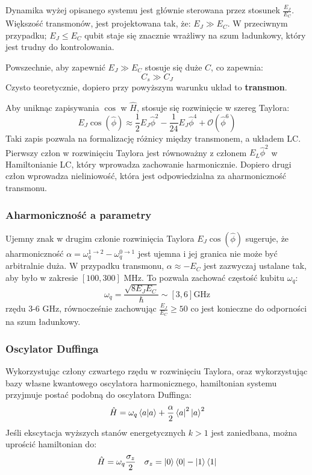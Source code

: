 \documentclass{../notatki}
\begin{document}
Dynamika wyżej opisanego systemu jest głównie sterowana przez
stosunek $\frac{E_J}{E_C}$. Większość transmonów, jest projektowana
tak, że: $E_J \gg E_C$. W przeciwnym przypadku; $E_J \leq E_C$ qubit
staje się znacznie wrażliwy na szum ładunkowy, który jest trudny do
kontrolowania.

Powszechnie, aby zapewnić $E_J \gg E_C$ stosuje się duże $C$, co zapewnia:
$$
C_s \gg C_J
$$
Czysto teoretycznie, dopiero przy powyższym warunku układ to \textbf{transmon}.

Aby uniknąc zapisywania $\cos$ w $\hat{H}$, stosuje się rozwinięcie w
szereg Taylora:
$$
E_J \cos(\hat{\phi}) \approx \frac{1}{2} E_J
\hat{\phi}^2 - \frac{1}{24} E_J \hat{\phi}^4 + \mathcal{O}(\hat{\phi}^6)
$$
Taki zapis pozwala na formalizację różnicy między transmonem, a
układem LC. Pierwszy człon w rozwinięciu Taylora jest równoważny z
członem $E_L \hat{\phi}^2$ w Hamiltonianie LC, który wprowadza zachowanie
harmonicznie. Dopiero drugi człon wprowadza nieliniowość, która jest
odpowiedzialna za
aharmoniczność transmonu.

\subsubsection{Aharmoniczność a parametry}

Ujemny znak w drugim członie rozwinięcia Taylora $E_J
\cos(\hat{\phi})$ sugeruje, że
aharmoniczność $\alpha = \omega_q^{1 \to 2} - \omega_q^{0 \to 1}$
jest ujemna i jej granica nie może być arbitralnie duża. W przypadku
transmonu, $\alpha \approx -E_C$ jest zazwyczaj ustalane tak, aby było w
zakresie $[100, 300]$ MHz. To pozwala zachować częstość kubitu $\omega_q$:
$$
\omega_q = \frac{\sqrt{8E_JE_C}}{\hbar} \sim [3, 6] \text{GHz}
$$
rzędu 3-6 GHz, równocześnie zachowując $\frac{E_J}{E_C} \geq 50$ co
jest konieczne do odporności na szum ładunkowy.

\subsubsection{Oscylator Duffinga}

Wykorzystując człony czwartego rzędu w rozwinięciu Taylora, oraz wykorzystując
bazy własne kwantowego oscylatora harmonicznego, hamiltonian systemu przyjmuje
postać podobną do oscylatora Duffinga:
$$
\hat{H} = \omega_q \bra{a}\ket{a} + \frac{\alpha}{2} \bra{a}^2\ket{a}^2
$$
Jeśli ekscytacja wyższych stanów energetycznych $k > 1$ jest
zaniedbana, można uprościć hamiltonian do:
$$
\hat{H} = \omega_q \frac{\sigma_z}{2} \quad \sigma_z = \ket{0}\bra{0}
- \ket{1}\bra{1}
$$
\end{document}
